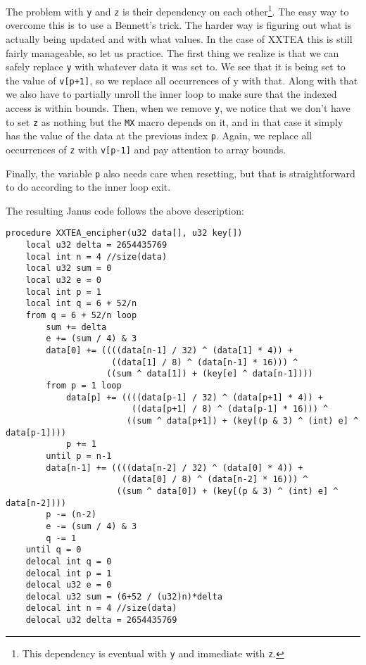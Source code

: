 \documentclass[a4paper,10pt,openright]{memoir}
\newcommand{\code}[1]{\texttt{#1}}
\begin{document}
The problem with \code{y} and \code{z} is their dependency on each 
other\footnote{This dependency is eventual with \code{y} and immediate 
with \code{z}.}. The easy way to overcome this is to use a Bennett's 
trick. The harder way is figuring out what is actually being updated 
and with what values. In the case of XXTEA this is still fairly 
manageable, so let us practice. The first thing we realize is that we 
can safely replace \code{y} with whatever data it was set to. We see 
that it is being set to the value of \code{v[p+1]}, so we replace all 
occurrences of y with that. Along with that we also have to partially 
unroll the inner loop to make sure that the indexed access is within 
bounds. Then, when we remove \code{y}, we notice that we don't have to 
set \code{z} as nothing but the \code{MX} macro depends on it, and in 
that case it simply has the value of the data at the previous index 
\code{p}. Again, we replace all occurrences of \code{z} with 
\code{v[p-1]} and pay attention to array bounds.

Finally, the variable \code{p} also needs care when resetting, but that 
is straightforward to do according to the inner loop exit.

The resulting Janus code follows the above description:

\begin{lstlisting}
procedure XXTEA_encipher(u32 data[], u32 key[])
    local u32 delta = 2654435769
    local int n = 4 //size(data)
    local u32 sum = 0
    local u32 e = 0
    local int p = 1
    local int q = 6 + 52/n
    from q = 6 + 52/n loop
        sum += delta
        e += (sum / 4) & 3
        data[0] += ((((data[n-1] / 32) ^ (data[1] * 4)) +
                     ((data[1] / 8) ^ (data[n-1] * 16))) ^ 
                    ((sum ^ data[1]) + (key[e] ^ data[n-1])))
        from p = 1 loop
            data[p] += ((((data[p-1] / 32) ^ (data[p+1] * 4)) + 
                         ((data[p+1] / 8) ^ (data[p-1] * 16))) ^
                        ((sum ^ data[p+1]) + (key[(p & 3) ^ (int) e] ^ data[p-1])))
            p += 1
        until p = n-1
        data[n-1] += ((((data[n-2] / 32) ^ (data[0] * 4)) +
                       ((data[0] / 8) ^ (data[n-2] * 16))) ^
                      ((sum ^ data[0]) + (key[(p & 3) ^ (int) e] ^ data[n-2])))
        p -= (n-2)
        e -= (sum / 4) & 3
        q -= 1
    until q = 0
    delocal int q = 0
    delocal int p = 1
    delocal u32 e = 0
    delocal u32 sum = (6+52 / (u32)n)*delta
    delocal int n = 4 //size(data)
    delocal u32 delta = 2654435769
\end{lstlisting}
\end{document}
